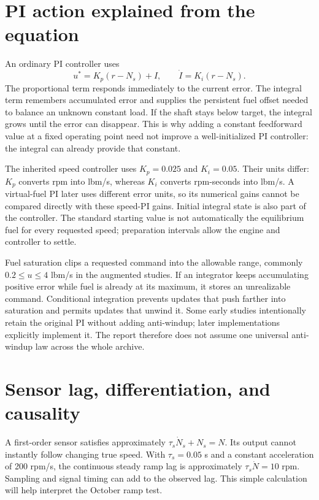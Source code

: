 \section{PI action explained from the equation}
An ordinary PI controller uses
\begin{equation}u^*=K_p(r-N_s)+I,\qquad \dot I=K_i(r-N_s).
\end{equation}
The proportional term responds immediately to the current error. The integral term remembers accumulated error and supplies the persistent fuel offset needed to balance an unknown constant load. If the shaft stays below target, the integral grows until the error can disappear. This is why adding a constant feedforward value at a fixed operating point need not improve a well-initialized PI controller: the integral can already provide that constant.

The inherited speed controller uses $K_p=0.025$ and $K_i=0.05$. Their units differ: $K_p$ converts rpm into lbm/s, whereas $K_i$ converts rpm-seconds into lbm/s. A virtual-fuel PI later uses different error units, so its numerical gains cannot be compared directly with these speed-PI gains. Initial integral state is also part of the controller. The standard starting value is not automatically the equilibrium fuel for every requested speed; preparation intervals allow the engine and controller to settle.

Fuel saturation clips a requested command into the allowable range, commonly $0.2\le u\le4$ lbm/s in the augmented studies. If an integrator keeps accumulating positive error while fuel is already at its maximum, it stores an unrealizable command. Conditional integration prevents updates that push farther into saturation and permits updates that unwind it. Some early studies intentionally retain the original PI without adding anti-windup; later implementations explicitly implement it. The report therefore does not assume one universal anti-windup law across the whole archive.

\section{Sensor lag, differentiation, and causality}
A first-order sensor satisfies approximately $\tau_s\dot N_s+N_s=N$. Its output cannot instantly follow changing true speed. With $\tau_s=0.05$ s and a constant acceleration of 200 rpm/s, the continuous steady ramp lag is approximately $\tau_s\dot N=10$ rpm. Sampling and signal timing can add to the observed lag. This simple calculation will help interpret the October ramp test.

